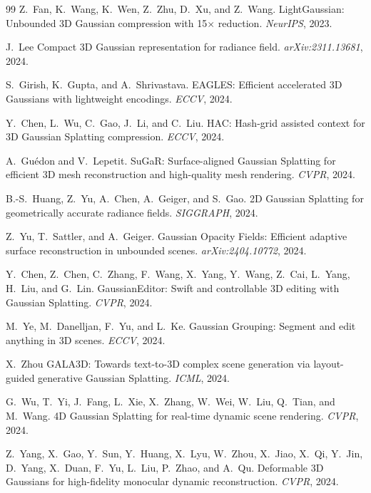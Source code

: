 \begin{thebibliography}{99}
Z.~Fan, K.~Wang, K.~Wen, Z.~Zhu, D.~Xu, and Z.~Wang.
LightGaussian: Unbounded 3D Gaussian compression with 15$\times$ reduction.
\emph{NeurIPS}, 2023.


J.~Lee \etal
Compact 3D Gaussian representation for radiance field.
\emph{arXiv:2311.13681}, 2024.


S.~Girish, K.~Gupta, and A.~Shrivastava.
EAGLES: Efficient accelerated 3D Gaussians with lightweight encodings.
\emph{ECCV}, 2024.


Y.~Chen, L.~Wu, C.~Gao, J.~Li, and C.~Liu.
HAC: Hash-grid assisted context for 3D Gaussian Splatting compression.
\emph{ECCV}, 2024.


A.~Gu\'{e}don and V.~Lepetit.
SuGaR: Surface-aligned Gaussian Splatting for efficient 3D mesh reconstruction
and high-quality mesh rendering.
\emph{CVPR}, 2024.


B.-S.~Huang, Z.~Yu, A.~Chen, A.~Geiger, and S.~Gao.
2D Gaussian Splatting for geometrically accurate radiance fields.
\emph{SIGGRAPH}, 2024.


Z.~Yu, T.~Sattler, and A.~Geiger.
Gaussian Opacity Fields: Efficient adaptive surface reconstruction in unbounded scenes.
\emph{arXiv:2404.10772}, 2024.


Y.~Chen, Z.~Chen, C.~Zhang, F.~Wang, X.~Yang, Y.~Wang, Z.~Cai, L.~Yang,
H.~Liu, and G.~Lin.
GaussianEditor: Swift and controllable 3D editing with Gaussian Splatting.
\emph{CVPR}, 2024.


M.~Ye, M.~Danelljan, F.~Yu, and L.~Ke.
Gaussian Grouping: Segment and edit anything in 3D scenes.
\emph{ECCV}, 2024.


X.~Zhou \etal
GALA3D: Towards text-to-3D complex scene generation via layout-guided
generative Gaussian Splatting.
\emph{ICML}, 2024.


G.~Wu, T.~Yi, J.~Fang, L.~Xie, X.~Zhang, W.~Wei, W.~Liu, Q.~Tian, and
M.~Wang.
4D Gaussian Splatting for real-time dynamic scene rendering.
\emph{CVPR}, 2024.


Z.~Yang, X.~Gao, Y.~Sun, Y.~Huang, X.~Lyu, W.~Zhou, X.~Jiao, X.~Qi,
Y.~Jin, D.~Yang, X.~Duan, F.~Yu, L.~Liu, P.~Zhao, and A.~Qu.
Deformable 3D Gaussians for high-fidelity monocular dynamic reconstruction.
\emph{CVPR}, 2024.



\end{thebibliography}

